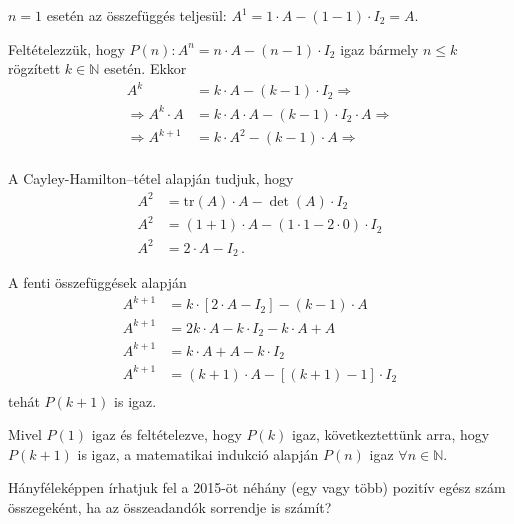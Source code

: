 \begin{solution}
$n=1$ esetén az összefüggés teljesül: $A^{1}=1\cdot A-(1-1)\cdot I_{2}=A$.

Feltételezzük, hogy $P(n):A^{n}=n\cdot A-(n-1)\cdot I_{2}$ igaz bármely
$n\leq k$ rögzített $k\in\mathbb{N}$ esetén. Ekkor 
\begin{align*}
A^{k} & =k\cdot A-(k-1)\cdot I_{2}\Rightarrow\\
\Rightarrow A^{k}\cdot A & =k\cdot A\cdot A-(k-1)\cdot I_{2}\cdot A\Rightarrow\\
\Rightarrow A^{k+1} & =k\cdot A^{2}-(k-1)\cdot A\Rightarrow\\
\end{align*}

A Cayley-Hamilton--tétel alapján tudjuk, hogy 
\begin{align*}
A^{2} & =\text{tr}(A)\cdot A-\det(A)\cdot I_{2}\\
A^{2} & =(1+1)\cdot A-(1\cdot1-2\cdot0)\cdot I_{2}\\
A^{2} & =2\cdot A-I_{2}\,.
\end{align*}

A fenti összefüggések alapján 
\begin{align*}
A^{k+1} & =k\cdot\left[2\cdot A-I_{2}\right]-(k-1)\cdot A\\
A^{k+1} & =2k\cdot A-k\cdot I_{2}-k\cdot A+A\\
A^{k+1} & =k\cdot A+A-k\cdot I_{2}\\
A^{k+1} & =(k+1)\cdot A-\left[(k+1)-1\right]\cdot I_{2}\\
\end{align*}
tehát $P(k+1)$ is igaz.

Mivel $P(1)$ igaz és feltételezve, hogy $P(k)$ igaz, következtettünk
arra, hogy $P(k+1)$ is igaz, a matematikai indukció alapján $P(n)$
igaz $\forall n\in\mathbb{N}$.
\end{solution}
\begin{extraproblem}
Hányféleképpen írhatjuk fel a 2015-öt néhány (egy vagy több) pozitív
egész szám összegeként, ha az összeadandók sorrendje is számít? 
\end{extraproblem}

